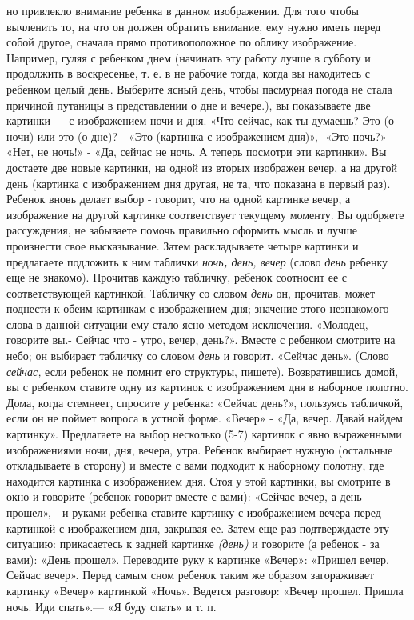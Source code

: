 \documentclass{book}
\renewcommand{\emph}[1]{\textit{#1}}
\begin{document}
но привлекло внимание ребенка в данном изображении. Для того чтобы
вычленить то, на что он должен обратить внимание, ему нужно иметь перед
собой другое, сначала прямо противоположное по облику изображение.
Например, гуляя с ребенком днем (начинать эту работу лучше в субботу и
продолжить в воскресенье, т. е. в не рабочие тогда, когда вы находитесь
с ребенком целый день. Выберите ясный день, чтобы пасмурная погода не
стала причиной путаницы в представлении о дне и вечере.), вы показываете
две картинки --- с изображением ночи и дня. «Что сейчас, как ты думаешь?
Это (о ночи) или это (о дне)? - «Это (картинка с изображением дня)»,-
«Это ночь?» - «Нет, не ночь!» - «Да, сейчас не ночь. А теперь посмотри
эти картинки». Вы достаете две новые картинки, на одной из вторых
изображен вечер, а на другой день (картинка с изображением дня другая,
не та, что показана в первый раз). Ребенок вновь делает выбор - говорит,
что на одной картинке вечер, а изображение на другой картинке
соответствует текущему моменту. Вы одобряете рассуждения, не забываете
помочь правильно оформить мысль и лучше произнести свое высказывание.
Затем раскладываете четыре картинки и предлагаете подложить к ним
таблички \emph{ночь\textbf{,} день, вечер} (слово \emph{день} ребенку
еще не знакомо). Прочитав каждую табличку, ребенок соотносит ее с
соответствующей картинкой. Табличку со словом \emph{день} он, прочитав,
может поднести к обеим картинкам с изображением дня; значение этого
незнакомого слова в данной ситуации ему стало ясно методом исключения.
«Молодец,- говорите вы.- Сейчас что - утро, вечер, день?». Вместе с
ребенком смотрите на небо; он выбирает табличку со словом \emph{день} и
говорит. «Сейчас день». (Слово \emph{сейчас,} если ребенок не помнит его
структуры, пишете). Возвратившись домой, вы с ребенком ставите одну из
картинок с изображением дня в наборное полотно. Дома, когда стемнеет,
спросите у ребенка: «Сейчас день?», пользуясь табличкой, если он не
поймет вопроса в устной форме. «Вечер» - «Да, вечер. Давай найдем
картинку». Предлагаете на выбор несколько (5-7) картинок с явно
выраженными изображениями ночи, дня, вечера, утра. Ребенок выбирает
нужную (остальные откладываете в сторону) и вместе с вами подходит к
наборному полотну, где находится картинка с изображением дня. Стоя у
этой картинки, вы смотрите в окно и говорите (ребенок говорит вместе с
вами): «Сейчас вечер, а день прошел», - и руками ребенка ставите
картинку с изображением вечера перед картинкой с изображением дня,
закрывая ее. Затем еще раз подтверждаете эту ситуацию: прикасаетесь к
задней картинке \emph{(день)} и говорите (а ребенок - за вами): «День
прошел». Переводите руку к картинке «Вечер»: «Пришел вечер. Сейчас
вечер». Перед самым сном ребенок таким же образом загораживает картинку
«Вечер» картинкой «Ночь». Ведется разговор: «Вечер прошел. Пришла ночь.
Иди спать».--- «Я буду спать» и т. п.
\end{document}
